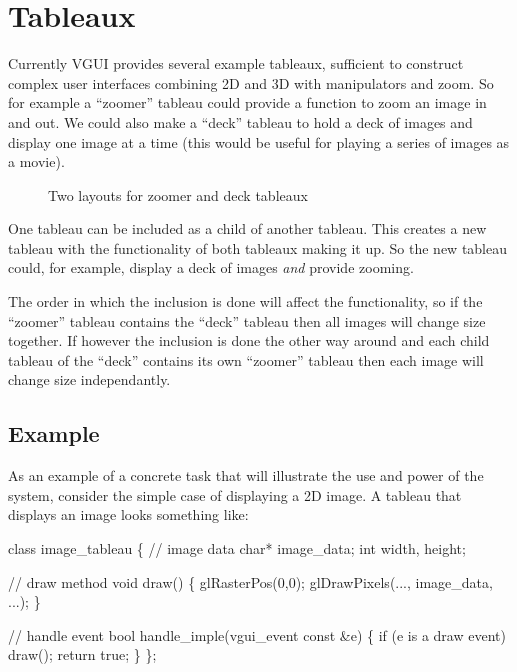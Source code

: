 \documentclass[12pt]{report} \usepackage{epsfig}
\begin{document}
\chapter{Tableaux}

Currently VGUI provides several example tableaux, sufficient to
construct complex user interfaces combining 2D and 3D with manipulators and zoom.
So for example a ``zoomer'' tableau could provide a function to zoom an image in and out.
We could also make a ``deck'' tableau to hold a deck of images and display one image at
a time (this would be useful for playing a series of images as a movie).

\begin{figure}[htb]
  \caption{Two layouts for zoomer and deck tableaux}
  \label{fig1}
\end{figure}

One tableau can be included as a child of another tableau.  This creates a new
tableau with the functionality of both tableaux making it up.
So the new tableau could, for example, display a deck of images {\it and} provide zooming.

The order in which the inclusion is done will affect the functionality, so if the
``zoomer'' tableau contains the ``deck'' tableau then all images will change
size together.  If however the inclusion is done the other way around and each
child tableau of the ``deck'' contains its own ``zoomer'' tableau
then each image will change size independantly.

\section{Example}

As an example of a concrete task that will illustrate the use and power of
the system, consider the simple case of displaying a 2D image.  A tableau
that displays an image looks something like:

{\scriptsize \begin{verbawf}
  class image\_tableau
  \{
    // image data
    char* image\_data;
    int width, height;

    // draw method
    void draw()
    \{
      glRasterPos(0,0);
      glDrawPixels(..., image\_data, ...);
     \}

    // handle event
    bool handle_imple(vgui_event const &e)
    \{
      if (e is a draw event)
        draw();
      return true;
    \}
  \};
\end{verbawf}}
\end{document}
